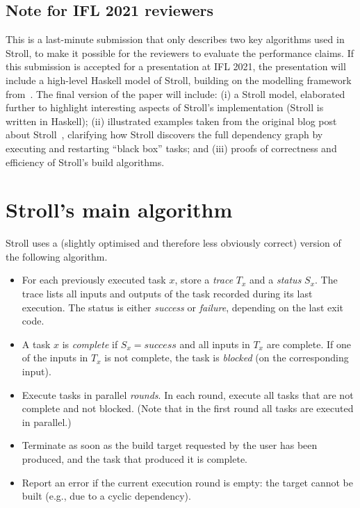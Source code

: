 \documentclass[sigconf]{acmart}
\begin{document}
\subsection*{Note for IFL 2021 reviewers}

This is a last-minute submission that only describes two key algorithms used in
Stroll, to make it possible for the reviewers to evaluate the performance
claims. If this submission is accepted for a presentation at IFL 2021, the
presentation will include a high-level Haskell model of Stroll, building on the
modelling framework from~\cite{mokhov2020build}. The final version of the paper
will include: (i) a Stroll model, elaborated further to highlight interesting
aspects of Stroll's implementation (Stroll is written in Haskell); (ii)
illustrated examples taken from the original blog post about
Stroll~\cite{stroll}, clarifying how Stroll discovers the full dependency graph
by executing and restarting ``black box'' tasks; and (iii) proofs of correctness
and efficiency of Stroll's build algorithms.

\section{Stroll's main algorithm}

Stroll uses a (slightly optimised and therefore less obviously correct) version
of the following algorithm.

\begin{itemize}
  \item For each previously executed task $x$, store a \emph{trace} $T_x$ and a
  \emph{status} $S_x$. The trace lists all inputs and outputs of the task
  recorded during its last execution. The status is either \emph{success} or
  \emph{failure}, depending on the last exit code.

  \item A task $x$ is \emph{complete} if $S_x=\textit{success}$ and all inputs
  in $T_x$ are complete. If one of the inputs in $T_x$ is not complete, the task
  is \emph{blocked} (on the corresponding input).

  \item Execute tasks in parallel \emph{rounds}. In each round, execute all
  tasks that are not complete and not blocked. (Note that in the first round all
  tasks are executed in parallel.)

  \item Terminate as soon as the build target requested by the user has been
  produced, and the task that produced it is complete.

  \item Report an error if the current execution round is empty: the target
  cannot be built (e.g., due to a cyclic dependency).
\end{itemize}
\end{document}

